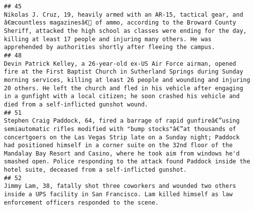 \documentclass[
]{article}
\begin{document}
\begin{verbatim}
## 45                                                                                                                                                                                                                                                                                                                                                                               Nikolas J. Cruz, 19, heavily armed with an AR-15, tactical gear, and â€œcountless magazinesâ€ of ammo, according to the Broward County Sheriff, attacked the high school as classes were ending for the day, killing at least 17 people and injuring many others. He was apprehended by authorities shortly after fleeing the campus.
## 48                                                                                                                                                                                                                                                                                                                    Devin Patrick Kelley, a 26-year-old ex-US Air Force airman, opened fire at the First Baptist Church in Sutherland Springs during Sunday morning services, killing at least 26 people and wounding and injuring 20 others. He left the church and fled in his vehicle after engaging in a gunfight with a local citizen; he soon crashed his vehicle and died from a self-inflicted gunshot wound.
## 51                                                                                                                                                                                                                                         Stephen Craig Paddock, 64, fired a barrage of rapid gunfireâ€”using semiautomatic rifles modified with "bump stocks"â€”at thousands of concertgoers on the Las Vegas Strip late on a Sunday night; Paddock had positioned himself in a corner suite on the 32nd floor of the Mandalay Bay Resort and Casino, where he took aim from windows he'd smashed open. Police responding to the attack found Paddock inside the hotel suite, deceased from a self-inflicted gunshot.
## 52                                                                                                                                                                                                                                                                                                                                                                                                                                                                                                                                    Jimmy Lam, 38, fatally shot three coworkers and wounded two others inside a UPS facility in San Francisco. Lam killed himself as law enforcement officers responded to the scene.

\end{verbatim}
\end{document}

